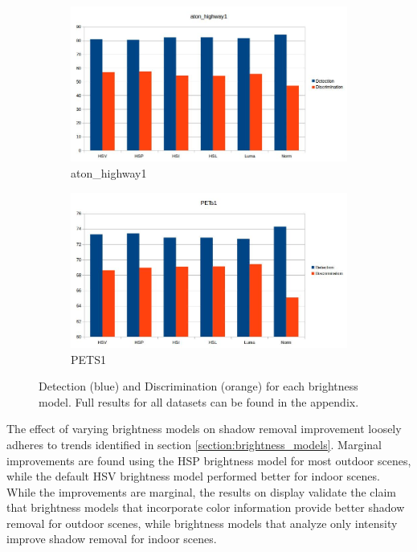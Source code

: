 \documentclass[12pt]{report}
\begin{document}
\begin{figure}
\centering
  \begin{subfigure}{1\linewidth}
  \includegraphics[width=1\linewidth]{figures/model/highway1_all_brightness_models.jpg}
  \caption{aton\_highway1}
\end{subfigure}
\hfill
  \begin{subfigure}{1\linewidth}
  \includegraphics[width=1\linewidth]{figures/model/pets1_all_brightness_models.jpg}
  \caption{PETS1}
\end{subfigure}
\caption{Detection (blue) and Discrimination (orange) for each brightness model. Full results for all datasets can be found in the appendix.}
\label{fig:pets1_bars_calc_all}
\end{figure}

The effect of varying brightness models on shadow removal improvement loosely adheres to trends identified in section \ref{section:brightness_models}. Marginal improvements are found using the HSP brightness model for most outdoor scenes, while the default HSV brightness model performed better for indoor scenes. While the improvements are marginal, the results on display validate the claim that brightness models that incorporate color information provide better shadow removal for outdoor scenes, while brightness models that analyze only intensity improve shadow removal for indoor scenes.
\end{document}
